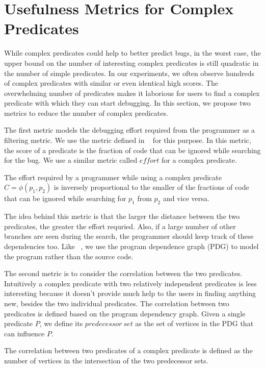 \section{Usefulness Metrics for Complex Predicates}
\label{sec-metrics}
While complex predicates could help to better predict bugs, in the worst case, the upper bound on the number of interesting complex predicates is still quadratic in the number of simple predicates.  In our experiments, we often observe hundreds of complex predicates with similar or even identical high scores.  The overwhelming number of predicates makes it laborious for users to find a complex predicate with which they can start debugging.  In this section, we propose two metrics to reduce the number of complex predicates.

The first metric models the debugging effort required from the programmer as a filtering metric.  We use the metric defined in ~\cite{1062522} for this purpose.  In this metric, the score of a predicate is the fraction of code that can be ignored while searching for the bug.  We use a similar metric called $effort$ for a complex predicate.

\begin{defn}
\label{dfn4}
The effort required by a programmer while using a complex predicate $C = \phi(p_1, p_2)$ is inversely proportional to the smaller of the fractions of code that can be ignored while searching for $p_1$ from $p_2$ and vice versa.
\end{defn}

The idea behind this metric is that the larger the distance between the two predicates, the greater the effort requried.  Also, if a 
large number of other branches are seen during the search, the programmer should keep track of these dependencies too.  Like ~\cite{1062522}, we use the program dependence graph (PDG) to model the program rather than the source code.

The second metric is to consider the correlation between the two predicates.  Intuitively a complex predicate with two relatively independent predicates is less interesting because it doesn't provide much help to the users in finding anything new, besides the two individual predicates.  The correlation between two predicates is defined based on the program dependency graph.  Given a single predicate $P$, we define its $predecessor\ set$ as the set of vertices in the PDG that can influence $P$.

\begin{defn}
\label{dfn5}
The correlation between two predicates of a complex predicate is defined as the number of vertices in the intersection of the two predecessor sets.
\end{defn}

